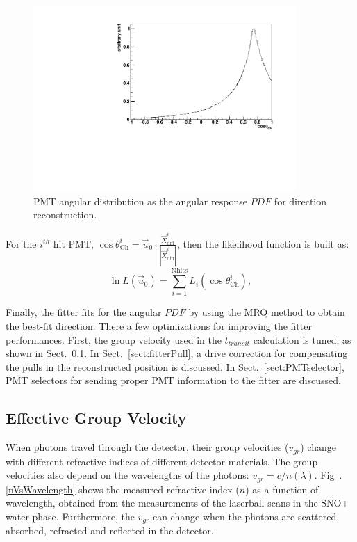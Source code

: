 \begin{figure}[!htb]
	\centering
	\includegraphics[width=10cm]{MPW_angularPDF.pdf}
	\caption{PMT angular distribution as the angular response $PDF$ for direction reconstruction.}
	\label{fig:MPW_angularPDF}
\end{figure}

For the $i^{th}$ hit PMT, $\cos\theta^i_{\mathrm{Ch}}=\vec{u}_0\cdot\frac{\vec{X}^i_{{\mathrm{diff}}}}{|\vec{X}^i_{{\mathrm{diff}}}|}$, then the likelihood function is built as:
\begin{equation}
\ln L(\vec{u}_0)=\sum_{i=1}^{{\mathrm{Nhits}}}L_i(\cos\theta_{\mathrm{Ch}}^i),
\end{equation}

Finally, the fitter fits for the angular $PDF$ by using the MRQ method to obtain the best-fit direction. There a few optimizations for improving the fitter performances. First, the group velocity used in the $t_{transit}$ calculation is tuned, as shown in Sect.~\ref{sect:tuneGroupVelocity}. In Sect.~\ref{sect:fitterPull}, a drive correction for compensating the pulls in the reconstructed position is discussed. In Sect.~\ref{sect:PMTselector}, PMT selectors for sending proper PMT information to the fitter are discussed. 

\subsection{Effective Group Velocity}\label{sect:tuneGroupVelocity}
When photons travel through the detector, their group velocities ($v_{gr}$) change with different refractive indices of different detector materials. The group velocities also depend on the wavelengths of the photons: $v_{gr}=c/n(\lambda)$. Fig~.\ref{nVsWavelength} shows the measured refractive index ($n$) as a function of wavelength, obtained from the measurements of the laserball scans in the SNO+ water phase\cite{laserball_groupVelocity}. Furthermore, the $v_{gr}$ can change when the photons are scattered, absorbed, refracted and reflected in the detector.

